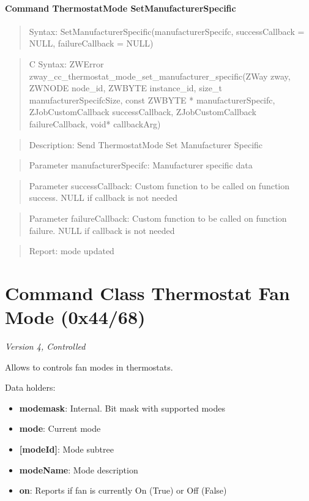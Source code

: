 \paragraph{Command ThermostatMode SetManufacturerSpecific}
\begin{quote}Syntax: SetManufacturerSpecific(manufacturerSpecifc, successCallback = NULL, failureCallback = NULL)\end{quote}
\begin{quote}C Syntax: ZWError zway\_cc\_thermostat\_mode\_set\_manufacturer\_specific(ZWay zway, ZWNODE node\_id, ZWBYTE instance\_id, size\_t manufacturerSpecifcSize, const ZWBYTE * manufacturerSpecifc, ZJobCustomCallback successCallback, ZJobCustomCallback failureCallback, void* callbackArg)\end{quote}
\begin{quote}Description: Send ThermostatMode Set Manufacturer Specific\end{quote}
\begin{quote}Parameter manufacturerSpecifc: Manufacturer specific data\end{quote}
\begin{quote}Parameter successCallback: Custom function to be called on function success. NULL if callback is not needed\end{quote}
\begin{quote}Parameter failureCallback: Custom function to be called on function failure. NULL if callback is not needed\end{quote}
\begin{quote}Report: mode updated\end{quote}


\section{Command Class Thermostat Fan Mode (0x44/68)}

\textit{Version 4, Controlled}
\newline

Allows to controls fan modes in thermostats.
\newline

\noindent
Data holders:

\begin{itemize}
\item \textbf{modemask}: Internal. Bit mask with supported modes
\item \textbf{mode}: Current mode
\item \textbf{[modeId]}: Mode subtree
\item \qquad\textbf{modeName}: Mode description
\item \textbf{on}: Reports if fan is currently On (True) or Off (False)
\end{itemize}

